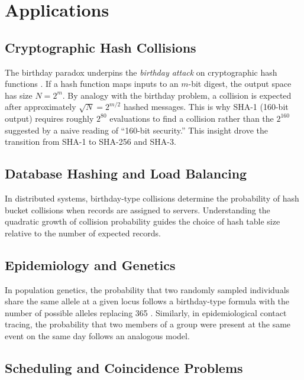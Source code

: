 \documentclass[12pt]{report}
\theoremstyle{definition}
\begin{document}
\chapter{Applications}

\section{Cryptographic Hash Collisions}

The birthday paradox underpins the \emph{birthday attack} on cryptographic hash
functions \citep{knuth1997}.  If a hash function maps inputs to an $m$-bit digest,
the output space has size $N = 2^m$.  By analogy with the birthday problem, a collision
is expected after approximately $\sqrt{N} = 2^{m/2}$ hashed messages.  This is why
SHA-1 (160-bit output) requires roughly $2^{80}$ evaluations to find a collision rather
than the $2^{160}$ suggested by a naive reading of ``160-bit security.''  This insight
drove the transition from SHA-1 to SHA-256 and SHA-3.

\section{Database Hashing and Load Balancing}

In distributed systems, birthday-type collisions determine the probability of hash
bucket collisions when records are assigned to servers.  Understanding the quadratic
growth of collision probability guides the choice of hash table size relative to the
number of expected records.

\section{Epidemiology and Genetics}

In population genetics, the probability that two randomly sampled individuals share
the same allele at a given locus follows a birthday-type formula with the number of
possible alleles replacing 365 \citep{weir1996}.  Similarly, in epidemiological
contact tracing, the probability that two members of a group were present at the same
event on the same day follows an analogous model.

\section{Scheduling and Coincidence Problems}
\end{document}

